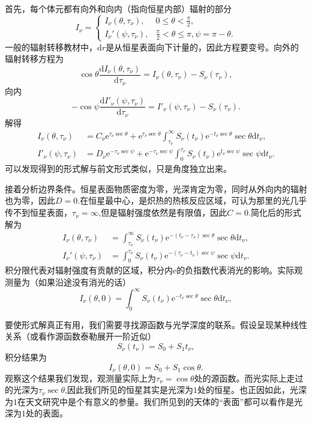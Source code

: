 \documentclass[../天体物理基础.tex]{subfiles}
\begin{document}
首先，每个体元都有向外和向内（指向恒星内部）辐射的部分
\begin{equation}
I_\nu=\begin{cases}
I_\nu(\theta,\tau_\nu), & 0\le\theta<\frac{\pi}{2},\\
I_\nu'(\psi,\tau_\nu), & \frac{\pi}2<\theta\le\pi,\psi=\pi-\theta.
\end{cases}
\end{equation}
一般的辐射转移教材中，$\mathrm{d}r$是从恒星表面向下计量的，因此方程要变号。向外的辐射转移方程为
\begin{equation}
\cos\theta\frac{\mathrm{d}I_\nu(\theta,\tau_\nu)}{\mathrm{d}\tau_\nu}=I_\nu(\theta,\tau_\nu)-S_\nu(\tau_\nu),
\end{equation}
向内
\begin{equation}
-\cos\psi\frac{\mathrm{d}I'_\nu(\psi,\tau_\nu)}{\mathrm{d}\tau_\nu}=I'_\nu(\psi,\tau_\nu)-S_\nu(\tau_\nu).
\end{equation}
解得
\begin{align}
I_\nu(\theta,\tau_\nu)&=C_\nu\mathrm{e}^{\tau_\nu\sec\theta}+\mathrm{e}^{\tau_\nu\sec\theta}\int_{\tau_\nu}^\infty S_\nu(t_\nu)\mathrm{e}^{-t_\nu\sec\theta}\sec\theta\mathrm{d}t_\nu,\\
I'_\nu(\psi,\tau_\nu)&=D_\nu\mathrm{e}^{-\tau_\nu\sec\psi}+\mathrm{e}^{-\tau_\nu\sec\psi}\int_{0}^{\tau_\nu} S_\nu(t_\nu)\mathrm{e}^{t_\nu\sec\psi}\sec\psi\mathrm{d}t_\nu.
\end{align}
可以发现得到的形式解与前文形式类似，只是角度独立出来。

接着分析边界条件。恒星表面物质密度为零，光深肯定为零，同时从外向内的辐射也为零，因此$D=0$.在恒星最中心，是炽热的热核反应区域，可认为那里的光几乎传不到恒星表面，$\tau_{\nu}=\infty$,但是辐射强度依然是有限值，因此$C=0$.简化后的形式解为
\begin{align}
I_\nu(\theta,\tau_\nu)&=\int_{\tau_\nu}^{\infty}S_\nu(t_\nu)\mathrm{e}^{-(t_\nu-\tau_\nu) \sec\theta}\sec\theta\mathrm{d}t_\nu,\\
I_\nu'(\psi,\tau_\nu)&=\int_0^{\tau_\nu}S_\nu(t_\nu)\mathrm{e}^{-(\tau_\nu-t_\nu)\sec\psi}\sec\psi\mathrm{d}t_\nu.
\end{align}
积分限代表对辐射强度有贡献的区域，积分内$\mathrm{e}$​的负指数代表消光的影响。实际观测量为（如果沿途没有消光的话）
\begin{equation}
I_\nu(\theta,0)=\int_{0}^{\infty}S_\nu(t_\nu)\mathrm{e}^{-t_\nu\sec\theta}\sec\theta\mathrm{d}t_\nu,
\end{equation}

要使形式解真正有用，我们需要寻找源函数与光学深度的联系。假设呈现某种线性关系（或看作源函数泰勒展开一阶近似）
\begin{equation}
S_{\nu}\left(t_{\nu}\right)=S_{0}+S_{1}t_{\nu},
\end{equation}
积分结果为
\begin{equation}
I_\nu(\theta,0)=S_{0}+S_{1}\cos\theta.
\end{equation}
观察这个结果我们发现，观测量实际上为$\tau_{\nu}=\cos\theta$处的源函数。而光实际上走过的光深为$\tau_{\nu}\sec\theta$,因此我们所见的恒星其实是光深为$1$处的恒星。也正因如此，光深为$1$在天文研究中是个有意义的参量。我们所见到的天体的“表面”都可以看作是光深为$1$处的表面。
\end{document}
